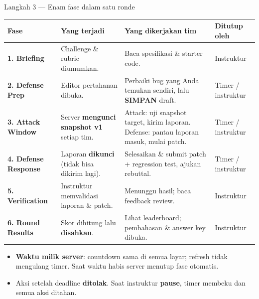 \documentclass[aspectratio=169,10pt]{beamer}
\newcommand{\hl}[1]{\textcolor{cyanx}{\textbf{#1}}}
\newcommand{\warn}[1]{\textcolor{redx}{\textbf{#1}}}
\begin{document}
\begin{frame}{Langkah 3 --- Enam fase dalam satu ronde}
\footnotesize
\renewcommand{\arraystretch}{1.25}
\begin{tabularx}{\textwidth}{@{}>{\raggedright\arraybackslash\bfseries}p{}LL>{\raggedright\arraybackslash}p{0.14\textwidth}@{}}
\toprule
Fase & Yang terjadi & Yang dikerjakan tim & Ditutup oleh\\. Briefing & Challenge \& rubric diumumkan. & Baca spesifikasi \& starter code. & Instruktur\\
2. Defense Prep & Editor pertahanan dibuka. & Perbaiki bug yang Anda temukan sendiri, lalu \textbf{SIMPAN} draft. & Timer / instruktur\\
3. \textcolor{redx}{Attack Window} & Server \textbf{mengunci snapshot v1} setiap tim. & \textcolor{redx}{Attack}: uji snapshot target, kirim laporan. \textcolor{cyanx}{Defense}: pantau laporan masuk, mulai patch. & Timer / instruktur\\
4. Defense Response & Laporan \textbf{dikunci} (tidak bisa dikirim lagi). & Selesaikan \& submit patch + regression test, ajukan rebuttal. & Timer / instruktur\\
5. Verification & Instruktur memvalidasi laporan \& patch. & Menunggu hasil; baca feedback review. & Instruktur\\
6. Round Results & Skor dihitung lalu \textbf{disahkan}. & Lihat leaderboard; pembahasan \& answer key dibuka. & Instruktur\\\bottomrule
\end{tabularx}
\vspace{0.6em}
\begin{itemize}\setlength\itemsep{0.15em}
  \item \hl{Waktu milik server}: countdown sama di semua layar; refresh tidak mengulang timer. Saat waktu habis server menutup fase otomatis.
  \item Aksi setelah deadline \warn{ditolak}. Saat instruktur \textbf{pause}, timer membeku dan semua aksi ditahan.
\end{itemize}
\end{frame}
\end{document}
